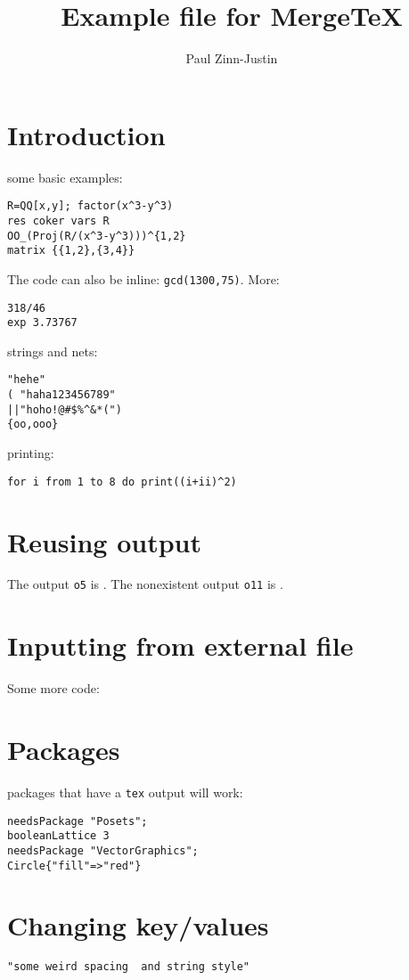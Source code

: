 \documentclass[12pt,a4paper]{amsart}
\title{Example file for MergeTeX}
\author{Paul Zinn-Justin}
\begin{document}
\maketitle

\section{Introduction}
some basic examples:
\begin{lstlisting}[language=Macaulay2]
R=QQ[x,y]; factor(x^3-y^3)
res coker vars R
OO_(Proj(R/(x^3-y^3)))^{1,2}
matrix {{1,2},{3,4}}
\end{lstlisting}

The code can also be inline: \lstinline[language=Macaulay2]!gcd(1300,75)!.
More:
\begin{lstlisting}[language=Macaulay2]
318/46
exp 3.73767
\end{lstlisting}
strings and nets:
\begin{lstlisting}[language=Macaulay2]
"hehe"
( "haha123456789"
||"hoho!@#$%^&*(")
{oo,ooo}
\end{lstlisting}
printing:
\begin{lstlisting}[language=Macaulay2]
for i from 1 to 8 do print((i+ii)^2)
\end{lstlisting}

\section{Reusing output}
The output {\tt o5} is .
The nonexistent output {\tt o11} is .

\section{Inputting from external file}
Some more code:


\section{Packages}
packages that have a {\tt tex} output will work:
\begin{lstlisting}[language=Macaulay2]
needsPackage "Posets";
booleanLattice 3
needsPackage "VectorGraphics";
Circle{"fill"=>"red"}
\end{lstlisting}

\section{Changing key/values}
\begin{lstlisting}[showstringspaces=true,language=Macaulay2,basewidth={1.5ex}]
"some weird spacing  and string style"
\end{lstlisting}
\end{document}
